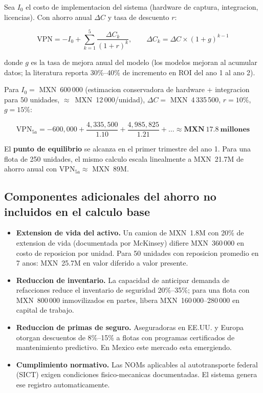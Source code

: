 \documentclass[10.5pt,a4paper]{article}
\begin{document}
Sea $I_0$ el costo de implementacion del sistema (hardware de captura,
integracion, licencias). Con ahorro anual $\Delta C$ y tasa de descuento $r$:

\begin{mathbox}
$$\mathrm{VPN} = -I_0 + \sum_{k=1}^{5} \frac{\Delta C_k}{(1+r)^k}, \qquad
  \Delta C_k = \Delta C \times (1 + g)^{k-1}$$

donde $g$ es la tasa de mejora anual del modelo (los modelos mejoran al acumular
datos; la literatura reporta 30\%--40\% de incremento en ROI del ano 1 al ano 2).
\end{mathbox}

Para $I_0 = $ MXN~600\,000 (estimacion conservadora de hardware + integracion
para 50 unidades, $\approx$~MXN~12\,000/unidad), $\Delta C = $ MXN~4\,335\,500,
$r = 10\%$, $g = 15\%$:

$$\mathrm{VPN}_{5\text{a}} = -600{,}000 + \frac{4{,}335{,}500}{1.10} +
  \frac{4{,}985{,}825}{1.21} + \ldots \approx \mathbf{MXN~17.8~\text{millones}}$$

El \textbf{punto de equilibrio} se alcanza en el primer trimestre del ano 1.
Para una flota de 250 unidades, el mismo calculo escala linealmente a
MXN~21.7M de ahorro anual con $\mathrm{VPN}_{5\text{a}} \approx$ MXN~89M.

\subsection{Componentes adicionales del ahorro no incluidos en el calculo base}

\begin{itemize}
  \item \textbf{Extension de vida del activo.} Un camion de MXN~1.8M con 20\%
    de extension de vida (documentada por McKinsey) difiere MXN~360\,000 en
    costo de reposicion por unidad. Para 50 unidades con reposicion promedio
    en 7 anos: MXN~25.7M en valor diferido a valor presente.
  \item \textbf{Reduccion de inventario.} La capacidad de anticipar demanda de
    refacciones reduce el inventario de seguridad 20\%--35\%; para una flota
    con MXN~800\,000 inmovilizados en partes, libera MXN~160\,000--280\,000
    en capital de trabajo.
  \item \textbf{Reduccion de primas de seguro.} Aseguradoras en EE.UU. y Europa
    otorgan descuentos de 8\%--15\% a flotas con programas certificados de
    mantenimiento predictivo. En Mexico este mercado esta emergiendo.
  \item \textbf{Cumplimiento normativo.} Las NOMs aplicables al autotransporte
    federal (SICT) exigen condiciones fisico-mecanicas documentadas. El sistema
    genera ese registro automaticamente.
\end{itemize}
\end{document}

